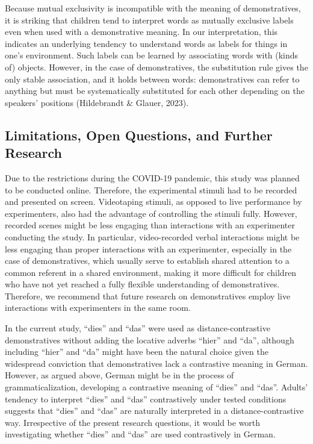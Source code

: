 \documentclass[
  man,floatsintext]{apa6}
\begin{document}
Because mutual exclusivity is incompatible with the meaning of demonstratives, it is striking that children tend to interpret words as mutually exclusive labels even when used with a demonstrative meaning. In our interpretation, this indicates an underlying tendency to understand words as labels for things in one's environment. Such labels can be learned by associating words with (kinds of) objects. However, in the case of demonstratives, the substitution rule gives the only stable association, and it holds between words: demonstratives can refer to anything but must be systematically substituted for each other depending on the speakers' positions (Hildebrandt \& Glauer, 2023).

\subsection{Limitations, Open Questions, and Further Research}\label{limitations-open-questions-and-further-research}

Due to the restrictions during the COVID-19 pandemic, this study was planned to be conducted online. Therefore, the experimental stimuli had to be recorded and presented on screen. Videotaping stimuli, as opposed to live performance by experimenters, also had the advantage of controlling the stimuli fully. However, recorded scenes might be less engaging than interactions with an experimenter conducting the study. In particular, video-recorded verbal interactions might be less engaging than proper interactions with an experimenter, especially in the case of demonstratives, which usually serve to establish shared attention to a common referent in a shared environment, making it more difficult for children who have not yet reached a fully flexible understanding of demonstratives. Therefore, we recommend that future research on demonstratives employ live interactions with experimenters in the same room.

In the current study, ``dies'' and ``das'' were used as distance-contrastive demonstratives without adding the locative adverbs ``hier'' and ``da'', although including ``hier'' and ``da'' might have been the natural choice given the widespread conviction that demonstratives lack a contrastive meaning in German. However, as argued above, German might be in the process of grammaticalization, developing a contrastive meaning of ``dies'' and ``das''. Adults' tendency to interpret ``dies'' and ``das'' contrastively under tested conditions suggests that ``dies'' and ``das'' are naturally interpreted in a distance-contrastive way. Irrespective of the present research questions, it would be worth investigating whether ``dies'' and ``das'' are used contrastively in German.
\end{document}
